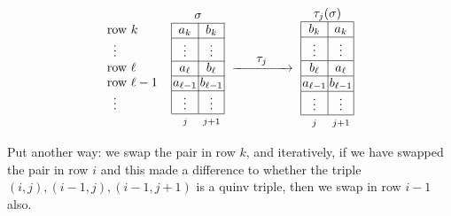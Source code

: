 \documentclass[ALCO,Unicode]{cedram}
\begin{document}
\begin{defn}
\begin{equation*}
\renewcommand{\arraystretch}{1}  %
\setlength{\arraycolsep}{1pt} %
\begin{array}{l|c|c|}
\multicolumn{1}{c}{}&
\multicolumn{2}{c}{\sigma}
\\
\cline{2-3} %
\text{row } k &  a_k & b_k\\
 \cline{2-3} %
\,\,\,\vdots & \vdots & \vdots \\
\cline{2-3}
\text{row } \ell & a_{\ell} & b_{\ell}\\
\cline{2-3} %
\text{row } \ell-1\,\,\,\,\,\, & a_{\ell-1} & b_{\ell-1}\\
 \cline{2-3}
\,\,\,\vdots & \vdots & \vdots \\
 \cline{2-3}
 \multicolumn{1}{c}{}&
\multicolumn{1}{c}{\scriptstyle j}&
\multicolumn{1}{c}{\scriptstyle j+1}
\end{array}
\,\,\xrightarrow{\makebox[1.5cm]{$\tau_j$}}\,\,
\begin{array}{|c|c|}
\multicolumn{2}{c}{\tau_j(\sigma)}
\\
\hline
b_k &  a_k\\
\hline
\vdots & \vdots \\
\hline
b_{\ell} & a_{\ell}\\
\hline
a_{\ell-1} & b_{\ell-1}\\
\hline
\vdots & \vdots \\
\hline
\multicolumn{1}{c}{\scriptstyle j}&
\multicolumn{1}{c}{\scriptstyle j+1}
\end{array}
\end{equation*}

Put another way: we swap the pair in row $k$, and iteratively, if we have swapped the pair in row $i$ and this made a difference to whether the triple $(i,j), (i-1, j), (i-1, j+1)$ is a quinv
triple, then we swap in row $i-1$ also. 
\end{defn}
\end{document}

